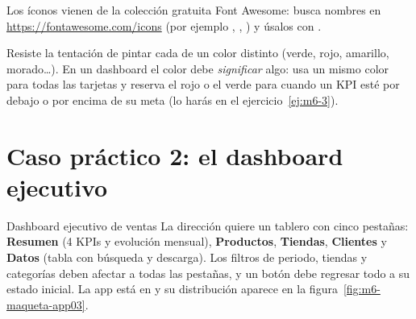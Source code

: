 Los íconos vienen de la colección gratuita Font Awesome: busca nombres en
\url{https://fontawesome.com/icons} (por ejemplo ,
, ) y úsalos con .

\begin{consejo}
Resiste la tentación de pintar cada  de un color
distinto (verde, rojo, amarillo, morado\ldots). En un dashboard el color
debe \emph{significar} algo: usa un mismo color para todas las tarjetas y
reserva el rojo o el verde para cuando un KPI esté por debajo o por encima
de su meta (lo harás en el ejercicio~\ref{ej:m6-3}).
\end{consejo}

\section{Caso práctico 2: el dashboard ejecutivo}
\label{sec:m6-app03}

\begin{ejemplo}{Dashboard ejecutivo de ventas}
La dirección quiere un tablero con cinco pestañas: \textbf{Resumen} (4 KPIs
y evolución mensual), \textbf{Productos}, \textbf{Tiendas},
\textbf{Clientes} y \textbf{Datos} (tabla con búsqueda y descarga). Los
filtros de periodo, tiendas y categorías deben afectar a todas las pestañas,
y un botón debe regresar todo a su estado inicial. La app está en
 y su distribución
aparece en la figura~\ref{fig:m6-maqueta-app03}.
\end{ejemplo}


